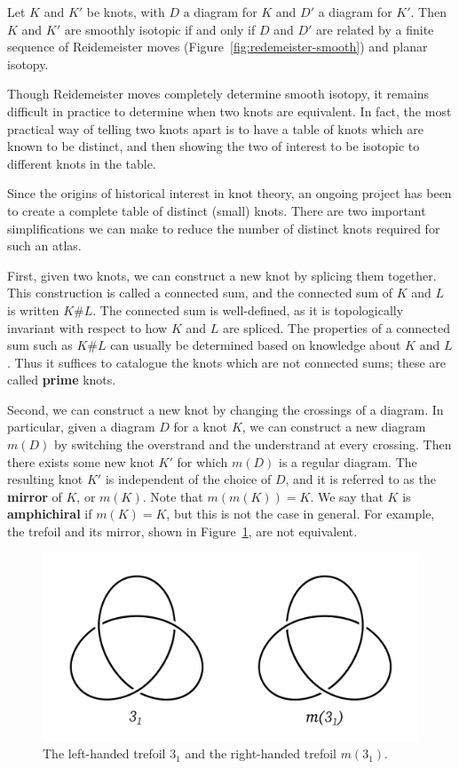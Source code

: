 \begin{theorem}
    Let $K$ and $K'$ be knots, with $D$ a diagram for $K$ and $D'$ a diagram for $K'$. 
    Then $K$ and $K'$ are smoothly isotopic if and only if $D$ and $D'$ are related by a finite sequence of Reidemeister moves (Figure~\ref{fig:redemeister-smooth}) and planar isotopy.
\end{theorem}

Though Reidemeister moves completely determine smooth isotopy, it remains difficult in practice to determine when two knots are equivalent. In fact, the most practical way of telling two knots apart is to have a table of knots which are known to be distinct, and then showing the two of interest to be isotopic to different knots in the table.

Since the origins of historical interest in knot theory, an ongoing project has been to create a complete table of distinct (small) knots. There are two important simplifications we can make to reduce the number of distinct knots required for such an atlas.

First, given two knots, we can construct a new knot by splicing them together. This construction is called a connected sum, and the connected sum of $K$ and $L$ is written $K \# L$. The connected sum is well-defined, as it is topologically invariant with respect to how $K$ and $L$ are spliced.
The properties of a connected sum such as $K \# L$ can usually be determined based on knowledge about $K$ and $L$. Thus it suffices to catalogue the knots which are not connected sums; these are called \textbf{prime} knots.

Second, we can construct a new knot by changing the crossings of a diagram. In particular, given a diagram $D$ for a knot $K$, we can construct a new diagram $m(D)$ by switching the overstrand and the understrand at every crossing. Then there exists some new knot $K'$ for which $m(D)$ is a regular diagram. The resulting knot $K'$ is independent of the choice of $D$, and it is referred to as the \textbf{mirror} of $K$, or $m(K)$. Note that $m(m(K)) = K$. We say that $K$ is \textbf{amphichiral} if $m(K) = K$, but this is not the case in general. For example, the trefoil and its mirror, shown in Figure~\ref{fig:mirror}, are not equivalent.

\begin{figure}[ht]
    \centering
    \includegraphics[width=0.5\linewidth]{images/mirror.pdf}
    \caption{The left-handed trefoil $3_1$ and the right-handed trefoil $m(3_1)$.}%
    \label{fig:mirror}
\end{figure}

